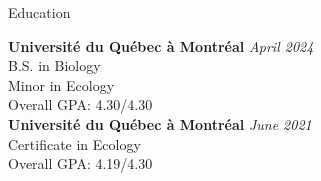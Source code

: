 \documentclass[
	11pt, %
]{resume} %
\begin{document}

\begin{rSection}{Education}
	
	\textbf{Université du Québec à Montréal} \hfill \textit{April 2024} \\ 
	B.S. in Biology\\ 
	Minor in Ecology \\ 
	Overall GPA: 4.30/4.30 
	\smallskip \\
	\textbf{Université du Québec à Montréal} \hfill \textit{June 2021} \\ 
	Certificate in Ecology\\ 
	Overall GPA: 4.19/4.30
	
\end{rSection}
\end{document}
